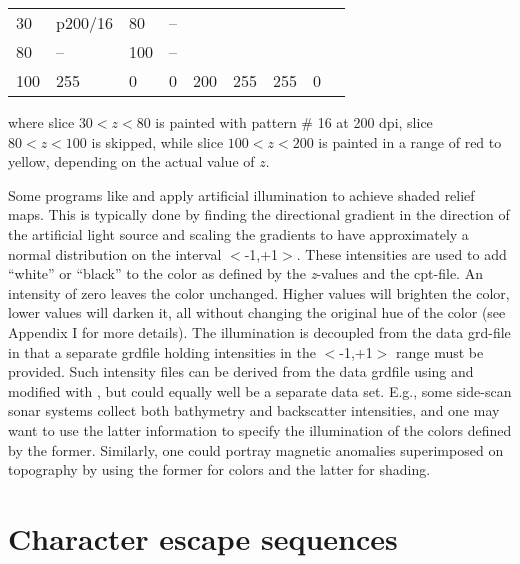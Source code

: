 \begin{center}
\begin{tabular}{lllllllll}
30 &  p200/16 &  80 & -- \\ 
80 &  -- &  100 &  -- \\
100 &  255 &  0  &  0  &  200 &  255 &  255  &  0 \\
\end{tabular} 
\end{center}
\noindent
where slice $30 < z < 80$ is painted with pattern \# 16 at 200 dpi,
slice $80 < z < 100$ is skipped, while slice $100 < z < 200$ is
painted in a range of red to yellow, depending on the actual value
of $z$.



Some programs like  and  apply artificial
illumination to achieve shaded relief maps.  This is typically done
by finding the directional gradient in the direction of the artificial
light source and scaling the gradients to have approximately a normal
distribution on the interval $<$-1,+1$>$.  These intensities are used
to add ``white'' or ``black'' to the color as defined by the {\it z}-values
and the cpt-file.  An intensity of zero leaves the color unchanged.
Higher values will brighten the color, lower values will darken it,
all without changing the original hue of the color (see Appendix I
for more details).  The illumination is decoupled from the data
grd-file in that a separate grdfile holding intensities in the
$<$-1,+1$>$ range must be provided.  Such intensity files can be
derived from the data grdfile using  and modified
with , but could equally well be a separate data set.
E.g., some side-scan sonar systems collect both bathymetry and
backscatter intensities, and one may want to use the latter information
to specify the illumination of the colors defined by the former.
Similarly, one could portray magnetic anomalies superimposed on
topography by using the former for colors and the latter for shading. 

\section{Character escape sequences}
\label{sec:escape}

